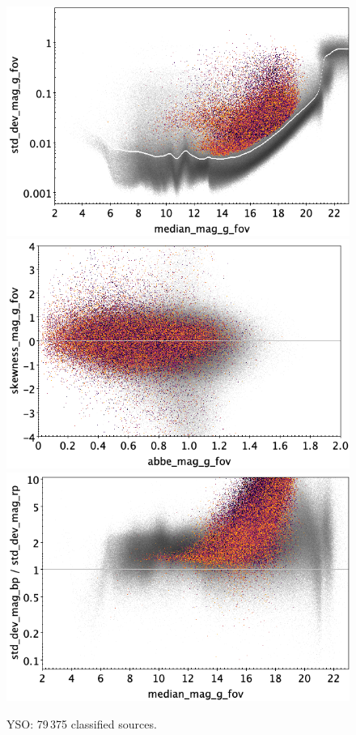 \documentclass[longauth]{aa}
\begin{document}
\begin{appendix}
\begin{figure}
\hspace{2mm}
 \includegraphics[width=0.45\hsize]{figures/appendix/YSO_cls_msd.png} \\ %
\vspace{4mm}
 \includegraphics[width=0.45\hsize]{figures/appendix/YSO_cls_ask.png}  %
\hspace{2mm}
 \includegraphics[width=0.45\hsize]{figures/appendix/YSO_cls_msdr.png}  \\ %
\vspace{4mm}
 \caption{YSO: 79\,375 classified sources.}  
 \label{fig:app:YSO}
\end{figure}


\end{appendix}
\end{document}
